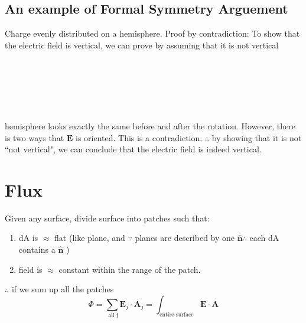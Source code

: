 \documentclass[12 pt , twoside, letterpaper] {article}
\renewcommand{\vec}[1]{\mathbf{#1}}
\let\oldhat\hat
\renewcommand{\hat}[1]{\oldhat{\mathbf{#1}}}
\begin{document}
\subsection{An example of Formal Symmetry Arguement}
Charge evenly distributed on a hemisphere.
Proof by contradiction:
To show that the electric field is vertical,  we can prove by assuming that it is not vertical
\\
\\
\\
\\
\\
\\
\\
hemisphere looks exactly the same before and after the rotation. 
However, there is two ways that $\vec E$ is oriented. This is a contradiction.
$\therefore$ by showing that it is not ``not vertical", we can conclude that the electric field is indeed vertical.
\section{Flux}
Given any surface, divide surface into patches such that:
\begin{enumerate}
\item dA is $\approx$ flat (like  plane, and $\because$ planes are described by one $\hat n \therefore$ each dA contains a $\hat n $ )
\item field is $\approx$ constant within the range of the patch.
\end{enumerate}
$\therefore$ if we sum up all the patches
$$\Phi =\sum _{\text{ all j}} \vec {E}_j \cdot \vec A_j=\int_{\text{entire surface}} \vec E \cdot \vec A$$
\end{document}
